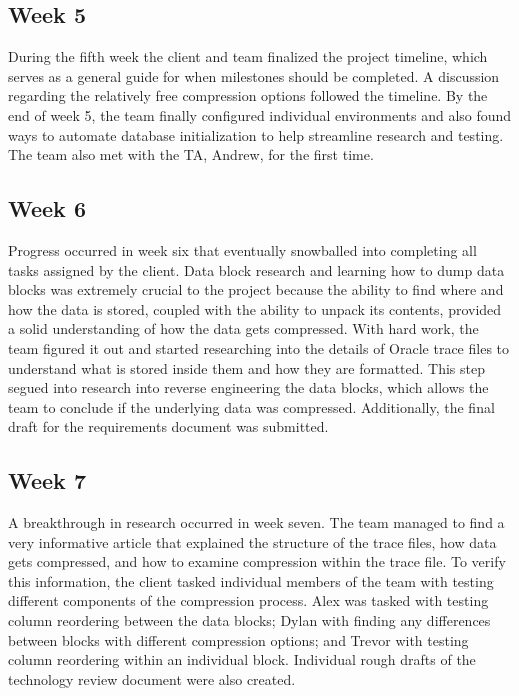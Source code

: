 \documentclass[10pt]{article}
\begin{document}
\subsection{Week 5}
During the fifth week the client and team finalized the project timeline, which serves as a general guide for when milestones should be completed. A discussion regarding the relatively free compression options followed the timeline. By the end of week 5, the team finally configured individual environments and also found ways to automate database initialization to help streamline research and testing. The team also met with the TA, Andrew, for the first time.

\subsection{Week 6}
Progress occurred in week six that eventually snowballed into completing all tasks assigned by the client. Data block research and learning how to dump data blocks was extremely crucial to the project because the ability to find where and how the data is stored, coupled with the ability to unpack its contents, provided a solid understanding of how the data gets compressed. With hard work, the team figured it out and started researching into the details of Oracle trace files to understand what is stored inside them and how they are formatted. This step segued into research into reverse engineering the data blocks, which allows the team to conclude if the underlying data was compressed. Additionally, the final draft for the requirements document was submitted.

\subsection{Week 7}
A breakthrough in research occurred in week seven. The team managed to find a very informative article that explained the structure of the trace files, how data gets compressed, and how to examine compression within the trace file. To verify this information, the client tasked individual members of the team with testing different components of the compression process. Alex was tasked with testing column reordering between the data blocks; Dylan with finding any differences between blocks with different compression options; and Trevor with testing column reordering within an individual block. Individual rough drafts of the technology review document were also created.
\end{document}
